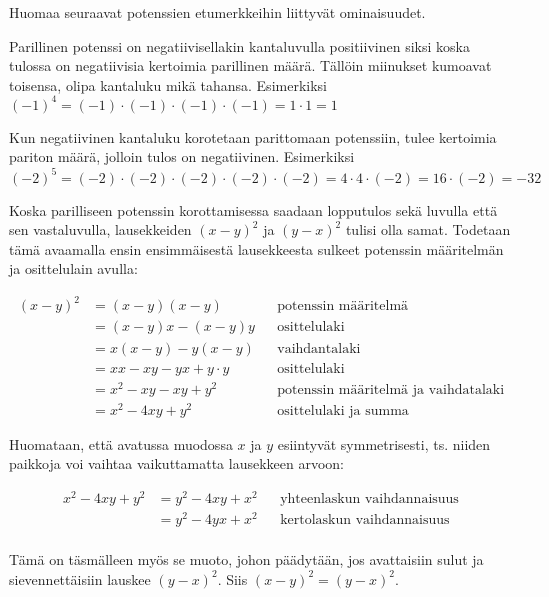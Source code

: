 Huomaa seuraavat potenssien etumerkkeihin liittyvät ominaisuudet.


Parillinen potenssi on negatiivisellakin kantaluvulla positiivinen siksi koska tulossa on negatiivisia kertoimia parillinen määrä. Tällöin miinukset kumoavat toisensa, olipa kantaluku mikä tahansa.  Esimerkiksi $(-1)^4=(-1) \cdot (-1) \cdot (-1) \cdot (-1)= 1\cdot 1=1$

Kun negatiivinen kantaluku korotetaan parittomaan potenssiin, tulee kertoimia pariton määrä, jolloin tulos on negatiivinen. 
Esimerkiksi $(-2)^5=(-2) \cdot (-2) \cdot (-2) \cdot (-2) \cdot (-2)=4\cdot4\cdot(-2)=16\cdot(-2)= -32$

\begin{esimerkki}

Koska parilliseen potenssin korottamisessa saadaan lopputulos sekä luvulla että sen vastaluvulla, lausekkeiden $(x-y)^2$ ja $(y-x)^2$ tulisi olla samat. Todetaan tämä avaamalla ensin ensimmäisestä lausekkeesta sulkeet potenssin määritelmän ja osittelulain avulla:

	\begin{align*}
	(x-y)^2
	&=(x-y)(x-y) && \text{potenssin määritelmä} \\
	&=(x-y)x-(x-y)y && \text{osittelulaki} \\
	&=x(x-y)-y(x-y) && \text{vaihdantalaki} \\
	&=xx-xy-yx+y\cdot y && \text{osittelulaki} \\
	&=x^2-xy-xy+y^2 && \text{potenssin määritelmä ja vaihdatalaki} \\
	&=x^2-4xy+y^2 && \text{osittelulaki ja summa}
	\end{align*}
	
	Huomataan, että avatussa muodossa $x$ ja $y$ esiintyvät symmetrisesti, ts. niiden paikkoja voi vaihtaa vaikuttamatta lausekkeen arvoon:
	
	\begin{align*}
	x^2-4xy+y^2
	&=y^2-4xy+x^2 && \text{yhteenlaskun vaihdannaisuus} \\
	&=y^2-4yx+x^2  && \text{kertolaskun vaihdannaisuus} \\
	\end{align*}
	
Tämä on täsmälleen myös se muoto, johon päädytään, jos avattaisiin sulut ja sievennettäisiin lauskee $(y-x)^2$. Siis $(x-y)^2=(y-x)^2$.
\end{esimerkki} %

